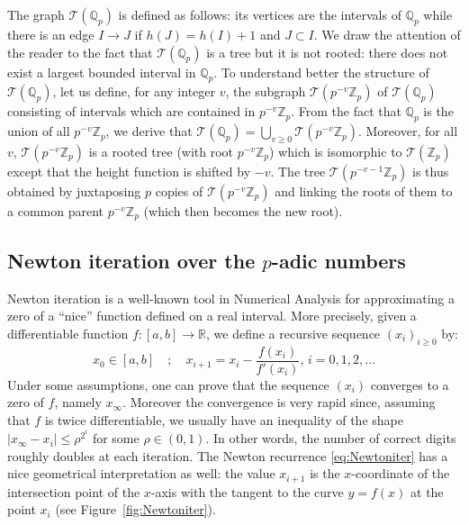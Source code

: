 \documentclass[11pt]{article}
\numberwithin{equation}{section}
\numberwithin{figure}{section}
\renewcommand{\leq}{\leqslant}
\renewcommand{\geq}{\geqslant}
\theoremstyle{definition}
\newcommand{\Z}{\mathbb Z}
\newcommand{\Zp}{\Z_p}
\newcommand{\Q}{\mathbb Q}
\newcommand{\Qp}{\Q_p}
\newcommand{\R}{\mathbb R}
\newcommand{\calT}{\mathcal T}
\begin{document}
The graph $\calT(\Qp)$ is defined as follows: its vertices are the 
intervals of $\Qp$ while there is an edge $I \to J$ if $h(J) = h(I) 
+ 1$ and $J \subset I$. We draw the attention of the reader to the
fact that $\calT(\Qp)$ is a tree but it is not rooted: there does not
exist a largest bounded interval in $\Qp$.
To understand better the structure of $\calT(\Qp)$, let us define, 
for any integer $v$, the subgraph $\calT(p^{-v} \Zp)$ of $\calT(\Qp)$ 
consisting of intervals which are contained in $p^{-v}\Zp$. From the
fact that $\Qp$ is the union of all $p^{-v}\Zp$, we derive that
$\calT(\Qp) = \bigcup_{v \geq 0} \calT(p^{-v}\Zp)$. Moreover, for all
$v$, $\calT(p^{-v} \Zp)$ is a rooted tree (with root $p^{-v}\Zp$)
which is isomorphic to $\calT(\Zp)$ except that the height function is 
shifted by $-v$. The tree $\calT(p^{-v-1}\Zp)$ is thus obtained by 
juxtaposing $p$ copies of $\calT(p^{-v}\Zp)$ and linking the roots of 
them to a common parent $p^{-v}\Zp$ (which then becomes the new root).

\subsection{Newton iteration over the $p$-adic numbers}

Newton iteration is a well-known tool in Numerical Analysis for 
approximating a zero of a ``nice'' function defined on a real interval.
More precisely, given a differentiable function $f : [a,b] \to \R$, we
define a recursive sequence $(x_i)_{i \geq 0}$ by:
\begin{equation}
\label{eq:Newtoniter}
x_0 \in [a,b] \quad ; \quad 
x_{i+1} = x_i - \frac{f(x_i)}{f'(x_i)}, \, i = 0, 1, 2, \ldots
\end{equation}
Under some assumptions, one can prove that the sequence $(x_i)$ 
converges to a zero of $f$, namely $x_\infty$. Moreover the convergence is 
very rapid since, assuming that $f$ is twice differentiable, we usually 
have an inequality of the shape $|x_\infty - x_i| \leq \rho^{2^i}$ for 
some $\rho \in (0,1)$. In other words, the number of correct digits 
roughly doubles at each iteration. The Newton recurrence 
\eqref{eq:Newtoniter} has a nice geometrical interpretation as well: the 
value $x_{i+1}$ is the $x$-coordinate of the intersection point of the 
$x$-axis with the tangent to the curve $y = f(x)$ at the point $x_i$ 
(see Figure~\ref{fig:Newtoniter}).
\end{document}
